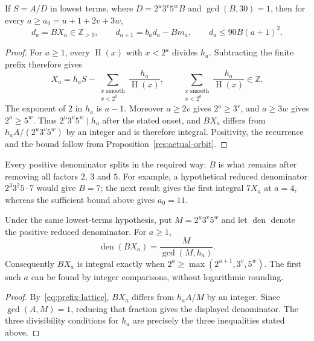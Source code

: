 \documentclass[11pt]{article}
\newcommand{\hgt}{\operatorname{H}}
\begin{document}
\begin{theorem}
\label{res:denominator-reduction}
If $S=A/D$ in lowest terms, where
$D=2^u3^v5^wB$ and $\gcd(B,30)=1$, then for every
$a\ge a_0=u+1+2v+3w$,
\[
 d_a=BX_a\in\mathbb Z_{>0},\qquad
 d_{a+1}=b_ad_a-Bm_a,\qquad d_a\le90B(a+1)^2.
\]
\end{theorem}
\begin{proof}
For $a\ge1$, every $\hgt(x)$ with $x<2^a$ divides $h_a$.  Subtracting
the finite prefix therefore gives
\begin{equation}\label{eq:prefix-lattice}
 X_a=h_aS-\sum_{\substack{x\text{ smooth}\\x<2^a}}
                  \frac{h_a}{\hgt(x)},
 \qquad
 \sum_{\substack{x\text{ smooth}\\x<2^a}}
                  \frac{h_a}{\hgt(x)}\in\mathbb Z.
\end{equation}
The exponent of $2$ in $h_a$ is $a-1$.  Moreover $a\ge2v$ gives
$2^a\ge3^v$, and $a\ge3w$ gives $2^a\ge5^w$.
Thus $2^u3^v5^w\mid h_a$ after the stated onset, and
$BX_a$ differs from $h_aA/(2^u3^v5^w)$ by an integer and is therefore
integral.  Positivity, the recurrence
and the bound follow from Proposition~\ref{res:actual-orbit}.
\end{proof}


Every positive denominator splits in the required way:
$B$ is what remains after removing all factors $2$, $3$ and $5$.  For
example, a hypothetical reduced denominator $2^3 3^2 5\cdot7$ would give
$B=7$; the next result gives the first integral $7X_a$ at $a=4$, whereas
the sufficient bound above gives $a_0=11$.

\begin{corollary}\label{res:exact-onset}
Under the same lowest-terms hypothesis, put $M=2^u3^v5^w$ and let
$\operatorname{den}$ denote the positive reduced denominator.  For $a\ge1$,
\[
 \operatorname{den}(BX_a)=\frac{M}{\gcd(M,h_a)}.
\]
Consequently $BX_a$ is integral exactly when
$2^a\ge\max(2^{u+1},3^v,5^w)$.  The first such $a$ can be found by
integer comparisons, without logarithmic rounding.
\end{corollary}
\begin{proof}
By~\eqref{eq:prefix-lattice}, $BX_a$ differs from $h_aA/M$ by an integer.
Since $\gcd(A,M)=1$, reducing that fraction gives
the displayed denominator.  The three divisibility conditions for $h_a$
are precisely the three inequalities stated above.
\end{proof}
\end{document}

